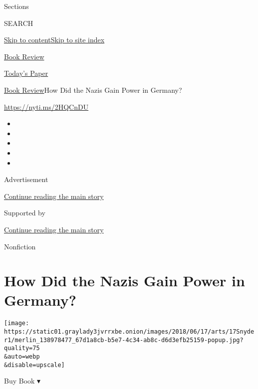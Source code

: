 Sections

SEARCH

\protect\hyperlink{site-content}{Skip to
content}\protect\hyperlink{site-index}{Skip to site index}

\href{https://www.nytimes3xbfgragh.onion/section/books/review}{Book
Review}

\href{https://myaccount.nytimes3xbfgragh.onion/auth/login?response_type=cookie\&client_id=vi}{}

\href{https://www.nytimes3xbfgragh.onion/section/todayspaper}{Today's
Paper}

\href{/section/books/review}{Book Review}\textbar{}How Did the Nazis
Gain Power in Germany?

\url{https://nyti.ms/2HQCnDU}

\begin{itemize}
\item
\item
\item
\item
\item
\end{itemize}

Advertisement

\protect\hyperlink{after-top}{Continue reading the main story}

Supported by

\protect\hyperlink{after-sponsor}{Continue reading the main story}

Nonfiction

\hypertarget{how-did-the-nazis-gain-power-in-germany}{%
\section{How Did the Nazis Gain Power in
Germany?}\label{how-did-the-nazis-gain-power-in-germany}}

\texttt{[image: https://static01.graylady3jvrrxbe.onion/images/2018/06/17/arts/17Snyder1/merlin\_138978477\_67d1a8cb-b5e7-4c34-ab8c-d6d3efb25159-popup.jpg?quality=75\\\&auto=webp\\\&disable=upscale]}

Buy Book ▾

